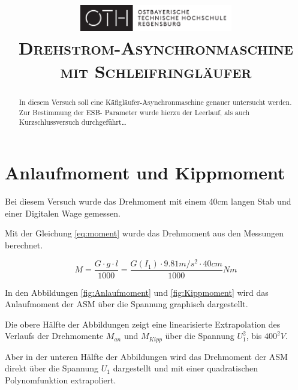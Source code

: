 \documentclass[conference]{IEEEtran}
\begin{document}
\title{
    \centering
    \includegraphics[width=0.5\textwidth]{../OTHR_OTHR_Logo.pdf}\\
    \textsc{Drehstrom-Asynchronmaschine mit Schleifringläufer} \\
}

\maketitle

\begin{abstract}
    In diesem Versuch soll eine Käfigläufer-Asynchronmaschine genauer
    untersucht werden. Zur Bestimmung der ESB- Parameter wurde hierzu der
    Leerlauf, als auch Kurzschlussversuch durchgeführt\dots
\end{abstract}

\section{Anlaufmoment und Kippmoment}

Bei diesem Versuch wurde das Drehmoment mit einem 40cm langen Stab und einer
Digitalen Wage gemessen.

Mit der Gleichung \ref{eq:moment} wurde das Drehmoment aus den Messungen berechnet.

\begin{equation} \label{eq:moment}
    M=\frac{G\cdot g\cdot l}{1000} = \frac{G(I_1)\cdot 9.81\si{m/s^2} \cdot 40\si{cm}}{1000} \si{Nm}
\end{equation}

In den Abbildungen \ref{fig:Anlaufmoment} und \ref{fig:Kippmoment} wird das
Anlaufmoment der ASM über die Spannung graphisch dargestellt.

Die obere Hälfte der Abbildungen zeigt eine linearisierte Extrapolation des
Verlaufs der Drehmomente $M_{an}$ und $M_{\textit{Kipp}}$ über die Spannung
$U_1^2$, bis $400^2V$.

Aber in der unteren Hälfte der Abbildungen wird das Drehmoment der ASM direkt
über die Spannung $U_1$ dargestellt und mit einer quadratischen Polynomfunktion
extrapoliert.
\end{document}
